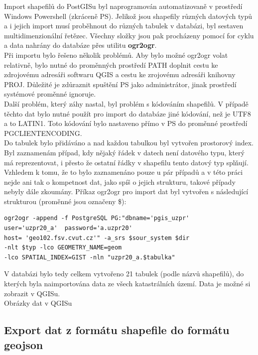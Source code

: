 \documentclass[12pt]{article}
\begin{document}
Import shapefilů do PostGISu byl naprogramován automatizovaně v prostředí Windows Powershell (zkráceně PS). Jelikož jsou shapefily různých datových typů a i jejich import musí proběhnout do různých tabulek v databázi, byl sestaven multidimenzionální řetězec. Všechny složky jsou pak procházeny pomocí for cyklu a data nahrány do databáze přes utilitu \textbf{ogr2ogr}. \\
\indent Při importu bylo řešeno několik problémů. Aby bylo možné ogr2ogr volat relativně, bylo nutné do proměnných prostředí PATH doplnit cestu ke zdrojovému adresáři softwaru QGIS a cestu ke zrojovému adresáři knihovny PROJ. Důležité je zdůraznit spuštění PS jako administrátor, jinak prostředí systémové proměnné ignoruje. \\
\indent Další problém, který záhy nastal, byl problém s kódováním shapefilů. V případě těchto dat bylo nutné použít pro import do databáze jiné kódování, než je UTF8 a to LATIN1. Toto kódování bylo nastaveno přímo v PS do proměnné prostředí PGCLIENTENCODING. \\
\indent Do tabulek bylo přidáváno a nad každou tabulkou byl vytvořen prostorový index. Byl zaznamenám případ, kdy nějaký řádek v datech není datového typu, který má reprezentovat, i přesto že ostatní řádky v shapefilu tento datový typ splňují. Vzhledem k tomu, že to bylo zaznamenáno pouze u pár případů a v této práci nejde ani tak o kompetnost dat, jako spíš o jejich strukturu, takové případy nebyly dále zkoumány. Příkaz ogr2ogr pro import dat byl vytvořen s následující strukturou (proměnné jsou označeny \$):

\begin{lstlisting}
ogr2ogr -append -f PostgreSQL PG:"dbname='pgis_uzpr' 
user='uzpr20_a'  password='a.uzpr20' 
host= 'geo102.fsv.cvut.cz'" -a_srs $sour_system $dir 
-nlt $typ -lco GEOMETRY_NAME=geom 
-lco SPATIAL_INDEX=GIST -nln "uzpr20_a.$tabulka"
\end{lstlisting}

V databázi bylo tedy celkem vytvořeno 21 tabulek (podle názvů shapefilů), do kterých byla naimportována data ze všech katastrálních území. Data je možné si zobrazit v QGISu.\\

Obrázky dat v QGISu

\subsection{Export dat z formátu shapefile do formátu geojson}
\end{document}
